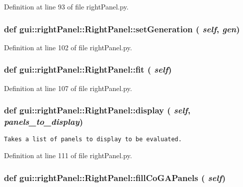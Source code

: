 Definition at line 93 of file rightPanel.py.
\subsubsection{\setlength{\rightskip}{0pt plus 5cm}def gui::rightPanel::RightPanel::setGeneration ( {\em self},  {\em gen})}\label{classgui_1_1rightPanel_1_1RightPanel_023eb0b2bf7fac399030739acc339b03}




Definition at line 102 of file rightPanel.py.
\subsubsection{\setlength{\rightskip}{0pt plus 5cm}def gui::rightPanel::RightPanel::fit ( {\em self})}\label{classgui_1_1rightPanel_1_1RightPanel_bf70234134187d005c7c7fece48c47aa}




Definition at line 107 of file rightPanel.py.
\subsubsection{\setlength{\rightskip}{0pt plus 5cm}def gui::rightPanel::RightPanel::display ( {\em self},  {\em panels\_\-to\_\-display})}\label{classgui_1_1rightPanel_1_1RightPanel_18a4a05946f710e26a077406ba65cd35}




\footnotesize\begin{verbatim}
Takes a list of panels to display to be evaluated.
\end{verbatim}
\normalsize
 

Definition at line 111 of file rightPanel.py.
\subsubsection{\setlength{\rightskip}{0pt plus 5cm}def gui::rightPanel::RightPanel::fillCoGAPanels ( {\em self})}\label{classgui_1_1rightPanel_1_1RightPanel_76f2fbaacfa72ceed53086189468e5f8}




